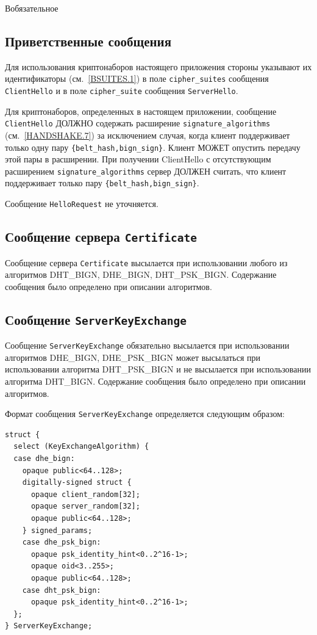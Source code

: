 \begin{appendix}{В}{обязательное}
\subsection{Приветственные сообщения}\label{BSUITES.4.2}

Для использования криптонаборов настоящего приложения стороны указывают их
идентификаторы (см.~\ref{BSUITES.1}) в поле \lstinline{cipher_suites}
сообщения \lstinline{ClientHello} и в поле \lstinline{cipher_suite}
сообщения \lstinline{ServerHello}.

Для криптонаборов, определенных в настоящем приложении, сообщение
\lstinline{ClientHello} ДОЛЖНО содержать расширение
\lstinline{signature_algorithms} (см.~\ref{HANDSHAKE.7}) за исключением
случая, когда клиент поддерживает только одну пару
\lstinline|{belt_hash,bign_sign}|. Клиент МОЖЕТ опустить передачу этой пары
в расширении. При получении ClientHello с отсутствующим расширением
\lstinline{signature_algorithms} сервер ДОЛЖЕН считать, что клиент
поддерживает только пару \lstinline|{belt_hash,bign_sign}|.

Сообщение \lstinline{HelloRequest} не уточняется.

\subsection{Сообщение сервера \lstinline{Certificate}}\label{BSUITES.4.3}

Сообщение сервера \lstinline{Certificate} высылается при использовании любого из 
алгоритмов DHT\_BIGN, DHE\_BIGN, DHT\_PSK\_BIGN. Содержание сообщения было 
определено при описании алгоритмов. 

\subsection{Сообщение \lstinline{ServerKeyExchange}}\label{BSUITES.4.4}

Сообщение \lstinline{ServerKeyExchange} обязательно высылается при использовании 
алгоритмов DHE\_BIGN, DHE\_PSK\_BIGN может высылаться при использовании 
алгоритма DHT\_PSK\_BIGN и не высылается при использовании алгоритма 
DHT\_BIGN. Содержание сообщения было определено при описании алгоритмов. 

Формат сообщения \lstinline{ServerKeyExchange} определяется следующим образом:
\begin{lstlisting}
struct {
  select (KeyExchangeAlgorithm) {
  case dhe_bign:
    opaque public<64..128>;
    digitally-signed struct {
      opaque client_random[32];
      opaque server_random[32];
      opaque public<64..128>;
    } signed_params;
    case dhe_psk_bign:
      opaque psk_identity_hint<0..2^16-1>;
      opaque oid<3..255>;
      opaque public<64..128>;
    case dht_psk_bign:
      opaque psk_identity_hint<0..2^16-1>;
  };
} ServerKeyExchange;
\end{lstlisting}


\end{appendix}
